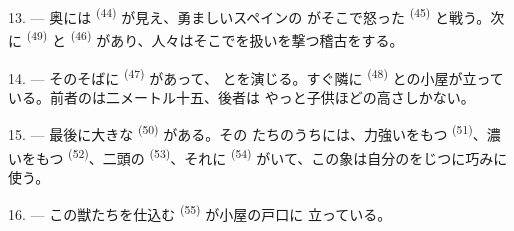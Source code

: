 13. --- 奥には \textsuperscript{(44)} が見え、勇ましいスペインの
がそこで怒った \textsuperscript{(45)} と戦う。次に
 \textsuperscript{(49)} と \textsuperscript{(46)}
があり、人々はそこでを扱いを撃つ稽古をする。

14. --- そのそばに \textsuperscript{(47)} があって、
とを演じる。すぐ隣に \textsuperscript{(48)}
との小屋が立っている。前者のは二メートル十五、後者は
やっと子供ほどの高さしかない。

15. --- 最後に大きな \textsuperscript{(50)} がある。その
たちのうちには、力強いをもつ
\textsuperscript{(51)}、濃いをもつ
\textsuperscript{(52)}、二頭の \textsuperscript{(53)}、それに
 \textsuperscript{(54)} がいて、この象は自分のをじつに巧みに
使う。

16. --- この獣たちを仕込む \textsuperscript{(55)} が小屋の戸口に
立っている。
\VUsaut{6.0mm}
\VUfilet{22mm}

